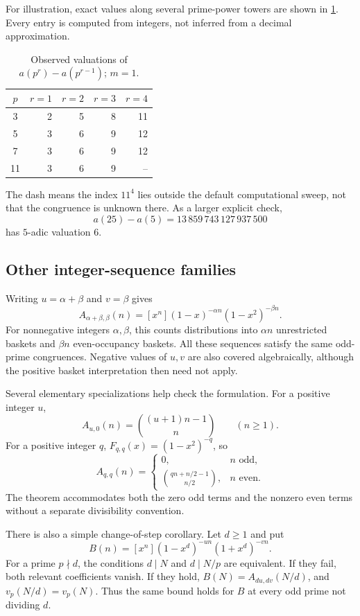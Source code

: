 \documentclass[11pt,a4paper]{article}
\numberwithin{equation}{section}
\theoremstyle{definition}
\theoremstyle{remark}
\newcommand{\vp}{v_p}
\begin{document}
For illustration, exact values along several prime-power towers are
shown in \cref{tab:valuations}. Every entry is computed from integers,
not inferred from a decimal approximation.
\begin{table}[htbp]
\centering
\caption{Observed valuations of $a(p^r)-a(p^{r-1})$; $m=1$.}
\label{tab:valuations}
\begin{tabular}{c r r r r}
\toprule
$p$ & $r=1$ & $r=2$ & $r=3$ & $r=4$\\
\midrule
3 & 2 & 5 & 8 & 11\\
5 & 3 & 6 & 9 & 12\\
7 & 3 & 6 & 9 & 12\\
11 & 3 & 6 & 9 & --\\
\bottomrule
\end{tabular}
\end{table}
The dash means the index $11^4$ lies outside the default computational
sweep, not that the congruence is unknown there. As a larger explicit
check,
\[
 a(25)-a(5)=13\,859\,743\,127\,937\,500
\]
has $5$-adic valuation $6$.

\subsection{Other integer-sequence families}

Writing $u=\alpha+\beta$ and $v=\beta$ gives
\begin{equation}\label{eq:alpha-beta}
 A_{\alpha+\beta,\beta}(n)
   =[x^n](1-x)^{-\alpha n}(1-x^2)^{-\beta n}.
\end{equation}
For nonnegative integers $\alpha,\beta$, this counts distributions into
$\alpha n$ unrestricted baskets and $\beta n$ even-occupancy baskets.
All these sequences satisfy the same odd-prime congruences. Negative
values of $u,v$ are also covered algebraically, although the positive
basket interpretation then need not apply.

Several elementary specializations help check the formulation.
For a positive integer $u$,
\[
 A_{u,0}(n)=\binom{(u+1)n-1}{n}\qquad(n\geq1).
\]
For a positive integer $q$, $F_{q,q}(x)=(1-x^2)^{-q}$, so
\[
 A_{q,q}(n)=
 \begin{cases}
 0,&n\text{ odd},\\
 \displaystyle\binom{qn+n/2-1}{n/2},&n\text{ even}.
 \end{cases}
\]
The theorem accommodates both the zero odd terms and the nonzero even
terms without a separate divisibility convention.

There is also a simple change-of-step corollary. Let $d\geq1$ and put
\[
 B(n)=[x^n](1-x^d)^{-un}(1+x^d)^{-vn}.
\]
For a prime $p\nmid d$, the conditions $d\mid N$ and $d\mid N/p$ are
equivalent. If they fail, both relevant coefficients vanish. If they
hold, $B(N)=A_{du,dv}(N/d)$, and
$\vp(N/d)=\vp(N)$. Thus the same bound holds for $B$ at every odd prime
not dividing $d$.
\end{document}
